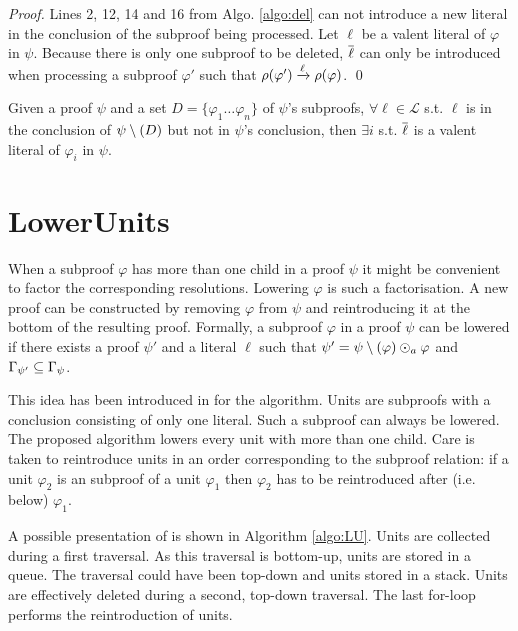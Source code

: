 \documentclass{llncs}
\begin{document}
\newcommand{\pedge}[3]{\ensuremath{\raiz{#1} \xrightarrow{#2} \raiz{#3}}}

\begin{proof}
Lines 2, 12, 14 and 16 from Algo. \ref{algo:del} can not introduce a new literal in the conclusion of
the subproof being processed. Let $\ell$ be a valent literal of $\varphi$ in $\psi$. Because
there is only one subproof to be deleted, $\overline{\ell}$ can only be introduced when processing a
subproof $\varphi'$ such that $\pedge{\varphi'}{\ell}{\varphi}$. \qed
\end{proof}

\begin{proposition}
Given a proof $\psi$ and a set $D = \{\varphi_1 \ldots \varphi_n\}$ of $\psi$'s subproofs, $\forall
\ell \in \mathcal{L}$ s.t. $\ell$ is in the conclusion of $\psi \setminus (D)$ but not in $\psi$'s
conclusion, then $\exists i$ s.t. $\overline{\ell}$ is a valent literal of $\varphi_i$ in $\psi$.
\end{proposition}


\section{LowerUnits} \label{sec:LU}

When a subproof $\varphi$ has more than one child in a proof $\psi$ it might be convenient to factor
the corresponding resolutions. Lowering $\varphi$ is such a factorisation. A new proof can be
constructed by removing $\varphi$ from $\psi$ and reintroducing it at the bottom of the resulting
proof. Formally, a subproof $\varphi$ in a proof $\psi$ can be lowered if there exists a proof
$\psi'$ and a literal $\ell$ such that $\psi' = \psi \setminus (\varphi) \odot_a \varphi$ and
$\Gamma_{\psi'} \subseteq \Gamma_{\psi}$.

This idea has been introduced in \cite{LURPI} for the {\LowerUnits} algorithm. Units are subproofs
with a conclusion consisting of only one literal. Such a subproof can always be lowered. The
proposed algorithm lowers every unit with more than one child. Care is taken to reintroduce units in
an order corresponding to the subproof relation: if a unit $\varphi_2$ is an subproof of a unit
$\varphi_1$ then $\varphi_2$ has to be reintroduced after (i.e. below) $\varphi_1$.

A possible presentation of {\LowerUnits} is shown in Algorithm \ref{algo:LU}. Units are collected
during a first traversal. As this traversal is bottom-up, units are stored in a queue. The traversal
could have been top-down and units stored in a stack. Units are effectively deleted during a second,
top-down traversal. The last for-loop performs the reintroduction of units.
\end{document}
